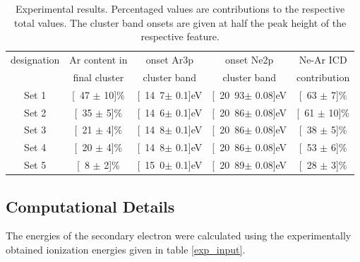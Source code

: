 \begin{table}[!h]                                                                                                                                       
 \centering                                                                                                                                      
 \caption{Experimental results. Percentaged values are contributions to the
          respective total values. The cluster band onsets are given
          at half the peak height of the respective feature.}
   \begin{tabular}{c c c c c}                                                                                                              
           \toprule
            designation    &       Ar content in   & onset Ar3p                    & onset Ne2p            & Ne-Ar ICD     \\
                                           &       final cluster   &   cluster band                & cluster band          & contribution  \\
           \midrule
           Set 1   &       \unit[47 $\pm$ 10]{\%}  &       \unit[14.7$\pm$ 0.1]{eV}        &       \unit[20.93$\pm$ 0.08]{eV}      &       \unit[63 $\pm$ 7]{\%}   \\
           Set 2   &       \unit[35 $\pm$ 5]{\%}   &       \unit[14.6$\pm$ 0.1]{eV}        &       \unit[20.86$\pm$ 0.08]{eV}      &       \unit[61 $\pm$ 10]{\%}  \\
           Set 3   &       \unit[21 $\pm$ 4]{\%}   &       \unit[14.8$\pm$ 0.1]{eV}        &       \unit[20.86$\pm$ 0.08]{eV}      &       \unit[38 $\pm$ 5]{\%}    \\
           Set 4   &       \unit[20 $\pm$ 4]{\%}   &       \unit[14.8$\pm$ 0.1]{eV}        &       \unit[20.86$\pm$ 0.08]{eV}      &       \unit[53 $\pm$ 6]{\%}    \\
           Set 5   &       \unit[8 $\pm$ 2]{\%}    &       \unit[15.0$\pm$ 0.1]{eV}        &       \unit[20.89$\pm$ 0.08]{eV}      &       \unit[28 $\pm$ 3]{\%}    \\
           \bottomrule
   \end{tabular}
\label{table:clustervalues}                                    
\end{table}




\subsection{Computational Details}
The energies of the secondary electron were calculated using the
experimentally obtained ionization energies given in table \ref{exp_input}.

